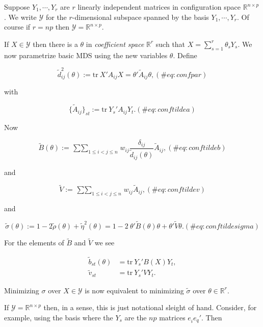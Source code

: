 \documentclass[
  12pt,
  letterpaper,
  DIV=11,
  numbers=noendperiod]{scrreprt}
\theoremstyle{remark}
\begin{document}
Suppose \(Y_1,\cdots,Y_r\) are \(r\) linearly independent matrices in
configuration space \(\mathbb{R}^{n\times p}\). We write \(\mathcal{Y}\)
for the \(r\)-dimensional subspace spanned by the basis
\(Y_1,\cdots,Y_r\). Of course if \(r=np\) then
\(\mathcal{Y}=\mathbb{R}^{n\times p}\).

If \(X\in\mathcal{Y}\) then there is a \(\theta\) in \emph{coefficient
space} \(\mathbb{R}^r\) such that \(X=\sum_{s=1}^r\theta_s Y_s\). We now
parametrize basic MDS using the new variables \(\theta\). Define

\begin{equation}
\tilde d_{ij}^2(\theta):=\text{tr}\ X'A_{ij}X=\theta'\tilde{A}_{ij}\theta,
(\#eq:confpar)
\end{equation}

with

\begin{equation}
\{\tilde A_{ij}\}_{st}:=\text{tr}\ Y_s'A_{ij}Y_t.
(\#eq:conftildea)
\end{equation}

Now

\begin{equation}
\tilde B(\theta):=\mathop{\sum\sum}_{1\leq i<j\leq n}w_{ij}\frac{\delta_{ij}}{\tilde d_{ij}(\theta)}\tilde A_{ij},
(\#eq:conftildeb)
\end{equation}

and

\begin{equation}
\tilde V:=\mathop{\sum\sum}_{1\leq i<j\leq n}w_{ij}\tilde A_{ij},
(\#eq:conftildev)
\end{equation}

and

\begin{equation}
\tilde\sigma(\theta):=1-2\tilde\rho(\theta)+\tilde\eta^2(\theta)=1-2\ \theta'\tilde B(\theta)\theta+\theta'\tilde V\theta.
(\#eq:conftildesigma)
\end{equation}

For the elements of \(\tilde B\) and \(\tilde V\) we see

\begin{align}
\tilde b_{st}(\theta)&=\text{tr}\ Y_s'B(X)Y_t,\\
\tilde v_{st}&=\text{tr}\ Y_s'VY_t.
\end{align}

Minimizing \(\sigma\) over \(X\in\mathcal{Y}\) is now equivalent to
minimizing \(\tilde\sigma\) over \(\theta\in\mathbb{R}^r\).

If \(\mathcal{Y}=\mathbb{R}^{n\times p}\) then, in a sense, this is just
notational sleight of hand. Consider, for example, using the basis where
the \(Y_s\) are the \(np\) matrices \(e_i^{\ }e_q'\). Then
\end{document}
